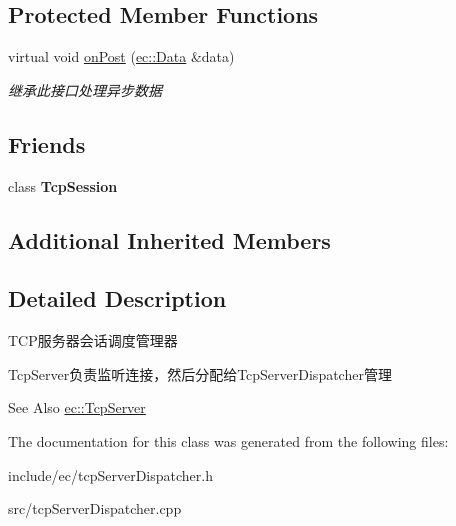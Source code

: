 \subsection*{Protected Member Functions}
\begin{DoxyCompactItemize}
\item 
\hypertarget{classec_1_1TcpServerDispatcher_a5dbcd5063ae16237b7228f87832832db}{virtual void \hyperlink{classec_1_1TcpServerDispatcher_a5dbcd5063ae16237b7228f87832832db}{on\-Post} (\hyperlink{classec_1_1Data}{ec\-::\-Data} \&data)}\label{classec_1_1TcpServerDispatcher_a5dbcd5063ae16237b7228f87832832db}

\begin{DoxyCompactList}\small\item\em 继承此接口处理异步数据 \end{DoxyCompactList}\end{DoxyCompactItemize}
\subsection*{Friends}
\begin{DoxyCompactItemize}
\item 
\hypertarget{classec_1_1TcpServerDispatcher_ad821fb654cf0b89cb6245fa831ec471c}{class {\bfseries Tcp\-Session}}\label{classec_1_1TcpServerDispatcher_ad821fb654cf0b89cb6245fa831ec471c}

\end{DoxyCompactItemize}
\subsection*{Additional Inherited Members}


\subsection{Detailed Description}
T\-C\-P服务器会话调度管理器 

Tcp\-Server负责监听连接，然后分配给\-Tcp\-Server\-Dispatcher管理 \begin{DoxySeeAlso}{See Also}
\hyperlink{classec_1_1TcpServer}{ec\-::\-Tcp\-Server} 
\end{DoxySeeAlso}


The documentation for this class was generated from the following files\-:\begin{DoxyCompactItemize}
\item 
include/ec/tcp\-Server\-Dispatcher.\-h\item 
src/tcp\-Server\-Dispatcher.\-cpp\end{DoxyCompactItemize}
